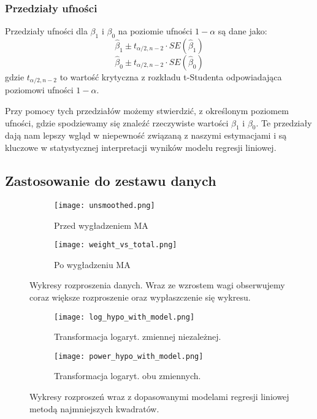 \documentclass{article}
\begin{document}
\subsubsection{Przedziały ufności}
\label{subsec:confint}
Przedziały ufności dla \(\beta_1\) i \(\beta_0\) na poziomie ufności \(1 - \alpha\) są dane jako:
\[\hat{\beta}_1 \pm t_{\alpha/2, n-2} \cdot SE(\hat{\beta}_1)\]
\[\hat{\beta}_0 \pm t_{\alpha/2, n-2} \cdot SE(\hat{\beta}_0)\]
gdzie \(t_{\alpha/2, n-2}\) to wartość krytyczna z rozkładu t-Studenta odpowiadająca poziomowi ufności \(1 - \alpha\).

Przy pomocy tych przedziałów możemy stwierdzić, z określonym poziomem ufności, gdzie spodziewamy się znaleźć rzeczywiste wartości \(\beta_1\) i \(\beta_0\). Te przedziały dają nam lepszy wgląd w niepewność związaną z naszymi estymacjami i są kluczowe w statystycznej interpretacji wyników modelu regresji liniowej.

\subsection{Zastosowanie do zestawu danych}
\begin{figure}[!htb]
\centering
\begin{subfigure}{.5\textwidth}
  \centering
  \texttt{[image: unsmoothed.png]}
  \caption{Przed wygładzeniem MA}
  \label{fig:przedma}
\end{subfigure}%
\begin{subfigure}{.5\textwidth}
  \centering
  \texttt{[image: weight\_vs\_total.png]}
  \caption{Po wygładzeniu MA}
  \label{fig:poma}
\end{subfigure}
\caption{Wykresy rozproszenia danych. Wraz ze wzrostem wagi obserwujemy coraz większe rozproszenie oraz wypłaszczenie się wykresu.}
\label{fig:rozproszenieprzedtrans}
\end{figure}


\begin{figure}[!h]
\centering
\begin{subfigure}{.5\textwidth}
  \centering
  \texttt{[image: log\_hypo\_with\_model.png]}
  \caption{Transformacja logaryt. zmiennej niezależnej.}
  \label{fig:logarytmiczne}
\end{subfigure}%
\begin{subfigure}{.5\textwidth}
  \centering
  \texttt{[image: power\_hypo\_with\_model.png]}
  \caption{Transformacja logaryt. obu zmiennych.}
  \label{fig:potegowa}
\end{subfigure}
\caption{Wykresy rozproszeń wraz z dopasowanymi modelami regresji liniowej metodą najmniejszych kwadratów.}
\label{fig:transformacje}
\end{figure}
\end{document}
